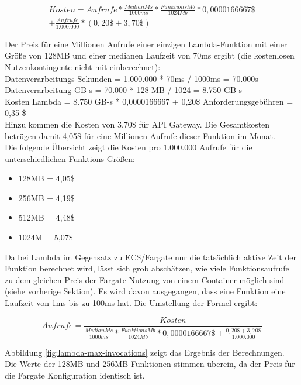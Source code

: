 \begin{equation}
\begin{split}
Kosten = Aufrufe * \frac{MedianMs}{1000ms} * \frac{FunktionsMb}{1024Mb} * 0,0000166667\$ \\
+ \frac{Aufrufe}{1.000.000} * (0,20\$ + 3,70\$)
\end{split}
\end{equation}

Der Preis für eine Millionen Aufrufe einer einzigen Lambda-Funktion mit einer Größe von 128MB und einer medianen Laufzeit von 70ms ergibt (die kostenlosen Nutzenkontingente nicht mit einberechnet): \\

Datenverarbeitungs-Sekunden = 1.000.000 * 70ms / 1000ms = 70.000s   \\
Datenverarbeitung GB-s = 70.000 * 128 MB / 1024 = 8.750 GB-s    \\
Kosten Lambda = 8.750 GB-s * 0,0000166667 + 0,20\$ Anforderungsgebühren = 0,35 \$     \\

Hinzu kommen die Kosten von 3,70\$ für API Gateway. Die Gesamtkosten betrügen damit 4,05\$ für eine Millionen Aufrufe dieser Funktion im Monat.    \\

Die folgende Übersicht zeigt die Kosten pro 1.000.000 Aufrufe für die unterschiedlichen Funktions-Größen:
\begin{itemize}
    \item 128MB = 4,05\$
    \item 256MB = 4,19\$
    \item 512MB = 4,48\$
    \item 1024M = 5,07\$
\end{itemize}

Da bei Lambda im  Gegensatz zu ECS/Fargate nur die tatsächlich aktive Zeit der Funktion berechnet wird, lässt sich grob abschätzen, wie viele Funktionsaufrufe zu dem gleichen Preis der Fargate Nutzung von einem Container möglich sind (siehe vorherige Sektion). Es wird davon ausgegangen, dass eine Funktion eine Laufzeit von 1ms bis zu 100ms hat. Die Umstellung der Formel ergibt:

\begin{equation}
Aufrufe = \frac{Kosten}{\frac{MedianMs}{1000ms} * \frac{FunktionsMb}{1024Mb} * 0,0000166667\$ + \frac{0,20\$ + 3,70\$}{1.000.000}}
\end{equation}

Abbildung \ref{fig:lambda-max-invocations} zeigt das Ergebnis der Berechnungen. Die Werte der 128MB und 256MB Funktionen stimmen überein, da der Preis für die Fargate Konfiguration identisch ist.

